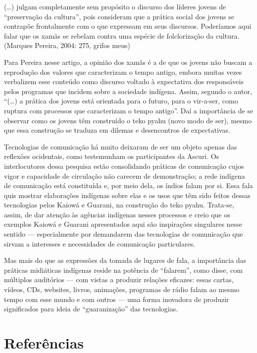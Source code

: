 (\ldots{}) julgam completamente sem propósito o discurso dos líderes jovens
de ``preservação da cultura'', pois
consideram que a prática social dos jovens se contrapõe frontalmente
com o que expressam em seus discursos. Poderíamos aqui falar que os
xamãs se rebelam contra uma espécie de folclorização da cultura.
(Marques Pereira, 2004:  275, grifos meus)

Para Pereira nesse artigo, a opinião dos xamãs é a de que os jovens não
buscam a reprodução dos valores que caracterizam o tempo antigo, embora
muitas vezes verbalizem esse conteúdo como discurso voltado à
expectativa dos responsáveis pelos programas que incidem sobre a
sociedade indígena. Assim, segundo o autor, ``(\ldots{}) a prática dos jovens
está orientada para o futuro, para o vir-a-ser, como ruptura com
processos que caracterizam o tempo antigo''. Daí a importância de se
observar como os jovens têm construído o teko pyahu (novo modo de ser),
mesmo que essa construção se traduza em dilemas e desencontros de
expectativas.

Tecnologias de comunicação há muito deixaram de ser um objeto apenas das
reflexões ocidentais, como testemunham os participantes da Ascuri. Os
interlocutores dessa pesquisa estão consolidando práticas de
comunicação cujos vigor e capacidade de circulação não carecem de
demonstração; a rede indígena de comunicação está constituída e, por
meio dela, os índios falam por si. Essa fala quis mostrar elaborações
indígenas sobre elas e os usos que têm sido feitos dessas tecnologias
pelos Kaiowá e Guarani, na construção do teko pyahu. Trata-se, assim,
de dar atenção às agências indígenas nesses processos e creio que os
exemplos Kaiowá e Guarani apresentados aqui são inspirações singulares
nesse sentido — especialmente por demandarem das tecnologias de
comunicação que sirvam a interesses e necessidades de comunicação
particulares. 

Mas mais do que as expressões da tomada de lugares de fala, a
importância das práticas midiáticas indígenas reside na potência de
``falarem'', como disse, com múltiplos auditórios — com vistas a produzir
relações eficazes: essas cartas, vídeos, CDs, websites, livros,
animações, programas de rádio falam ao mesmo tempo com esse mundo e com
outros — uma forma inovadora de produzir significados para ideia de
``guaranização'' das tecnologias.

\section{Referências}\ \  \ \ 

